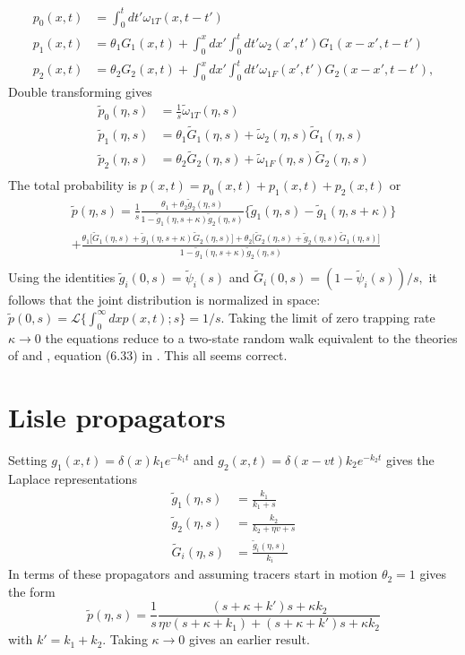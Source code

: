 \documentclass[11pt]{article}
\newcommand\be{\begin{equation}} %
\newcommand\ee{\end{equation}}   %
\newcommand\tom{\tilde{\omega}}
\newcommand\tg{\tilde{g}}
\newcommand\tp{\tilde{p}}
\newcommand\tG{\tilde{G}}
\begin{document}
\begin{align}
p_0(x,t) &= \int_0^t dt' \omega_{1T}(x,t-t')\\
p_1(x,t) &= \theta_1 G_1(x,t) + \int_0^x dx' \int_0^t dt' \omega_2(x',t')G_1(x-x',t-t')\\
p_2(x,t) &= \theta_2 G_2(x,t) + \int_0^x dx' \int_0^t dt' \omega_{1F}(x',t')G_2(x-x',t-t'),
\end{align}
Double transforming gives
\begin{align}
\tp_0(\eta,s) &= \frac{1}{s}\tom_{1T}(\eta,s)\\
\tp_1(\eta,s) &= \theta_1 \tG_1(\eta,s) + \tom_2(\eta,s) \tG_1(\eta,s) \\
\tp_2(\eta,s) &= \theta_2 \tG_2(\eta,s) + \tom_{1F}(\eta,s)\tG_2(\eta,s)\\
\end{align}
The total probability is $p(x,t) = p_0(x,t) + p_1(x,t) + p_2(x,t)$ or 
\begin{multline}
\tp(\eta,s) = \frac{1}{s}\frac{\theta_1 + \theta_2 \tg_2(\eta,s)}{1-\tg_1(\eta,s+\kappa)\tg_2(\eta,s)}\big\{\tg_1(\eta,s)-\tg_1(\eta,s+\kappa) \big\} \\
+\frac{\theta_1\big[\tG_1(\eta,s) + \tg_1(\eta,s+\kappa)\tG_2(\eta,s)\big]+ \theta_2\big[\tG_2(\eta,s) + \tg_2(\eta,s)\tG_1(\eta,s)\big]}{1-\tg_1(\eta,s+\kappa)\tg_2(\eta,s)} \\
\end{multline}
Using the identities $\tg_i(0,s) = \tilde{\psi}_i(s)$ and $\tG_i(0,s) = (1-\tilde{\psi}_i(s))/s,$ it follows that the joint distribution is normalized in space: $\tp(0,s) = \mathcal{L}\{\int_0^\infty dx p(x,t);s\} = 1/s$.
Taking the limit of zero trapping rate $\kappa \rightarrow 0$ the equations reduce to a two-state random walk equivalent to the theories of \citet{Einstein1937} and \citet{Lisle1998}, equation (6.33) in \citet{Weiss1994}. This all seems correct.

\section{Lisle propagators}
Setting $g_1(x,t) = \delta(x)k_1e^{-k_1t}$ and $g_2(x,t) = \delta(x-vt)k_2e^{-k_2 t}$ gives the Laplace representations
\begin{align}
\tg_1(\eta,s) &= \frac{k_1}{k_1 + s}\\
\tg_2(\eta,s) &=  \frac{k_2}{k_2 + \eta v + s} \\
\tG_i(\eta,s) &= \frac{\tg_i(\eta,s)}{k_i}
\end{align}
In terms of these propagators and assuming tracers start in motion $\theta_2 =1$ gives the form
\be \tp(\eta,s) =\frac{1}{s} \frac{(s+\kappa+k')s + \kappa k_2}{\eta v(s + \kappa + k_1) + (s+ \kappa + k')s + \kappa k_2} \ee
with $k' = k_1 + k_2$. Taking $\kappa \rightarrow 0$ gives an earlier result.
\end{document}
